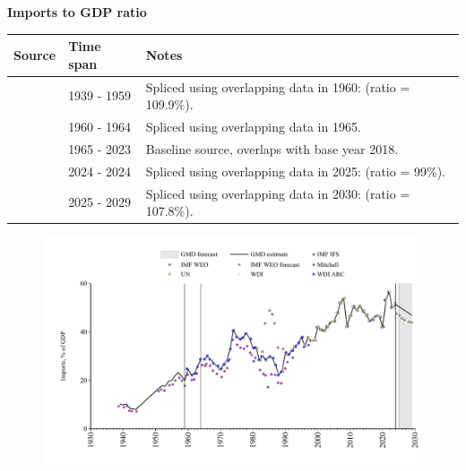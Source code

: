\documentclass[12pt,a4paper,landscape]{article}
\begin{document}
\begin{adjustbox}{max totalsize={\paperwidth}{\paperheight},center}
\begin{minipage}[t][\textheight][t]{\textwidth}
\vspace*{0.5cm}
{}
\begin{center}
{\Large\bfseries Imports to GDP ratio}
\end{center}
\vspace{0.5cm}
\begin{table}[H]
\centering
\small
\begin{tabular}{|l|l|l|}
\hline
\textbf{Source} & \textbf{Time span} & \textbf{Notes} \\
\hline
\rowcolor{white}\cite{Mitchell}& 1939 - 1959 &Spliced using overlapping data in 1960: (ratio = 109.9\%). \\
\rowcolor{lightgray}\cite{WDI_ARC}& 1960 - 1964 &Spliced using overlapping data in 1965. \\
\rowcolor{white}\cite{WDI}& 1965 - 2023 &Baseline source, overlaps with base year 2018. \\
\rowcolor{lightgray}\cite{IMF_IFS}& 2024 - 2024 &Spliced using overlapping data in 2025: (ratio = 99\%). \\
\rowcolor{white}\cite{IMF_WEO_forecast}& 2025 - 2029 &Spliced using overlapping data in 2030: (ratio = 107.8\%). \\
\hline
\end{tabular}
\end{table}
\begin{figure}[H]
\centering
\includegraphics[width=\textwidth,height=0.6\textheight,keepaspectratio]{graphs/SLV_imports_GDP.pdf}
\end{figure}
\end{minipage}
\end{adjustbox}
\end{document}
